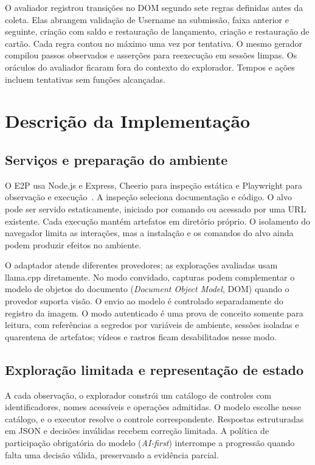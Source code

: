 \documentclass[12pt]{article}
\begin{document}
O avaliador registrou transições no DOM segundo sete regras definidas antes da coleta. Elas abrangem validação de Username na submissão, faixa anterior e seguinte, criação com saldo e restauração de lançamento, criação e restauração de cartão. Cada regra contou no máximo uma vez por tentativa. O mesmo gerador compilou passos observados e asserções para reexecução em sessões limpas. Os oráculos do avaliador ficaram fora do contexto do explorador. Tempos e ações incluem tentativas sem funções alcançadas.

\section{Descrição da Implementação}\label{sec:implementation}
\subsection{Serviços e preparação do ambiente}
O E2P usa Node.js e Express, Cheerio para inspeção estática e Playwright para observação e execução~\cite{microsoft2026playwright}. A inspeção seleciona documentação e código. O alvo pode ser servido estaticamente, iniciado por comando ou acessado por uma URL existente. Cada execução mantém artefatos em diretório próprio. O isolamento do navegador limita as interações, mas a instalação e os comandos do alvo ainda podem produzir efeitos no ambiente.

O adaptador atende diferentes provedores; as explorações avaliadas usam llama.cpp diretamente. No modo convidado, capturas podem complementar o modelo de objetos do documento (\textit{Document Object Model}, DOM) quando o provedor suporta visão. O envio ao modelo é controlado separadamente do registro da imagem. O modo autenticado é uma prova de conceito somente para leitura, com referências a segredos por variáveis de ambiente, sessões isoladas e quarentena de artefatos; vídeos e rastros ficam desabilitados nesse modo.

\subsection{Exploração limitada e representação de estado}
A cada observação, o explorador constrói um catálogo de controles com identificadores, nomes acessíveis e operações admitidas. O modelo escolhe nesse catálogo, e o executor resolve o controle correspondente. Respostas estruturadas em JSON e decisões inválidas recebem correção limitada. A política de participação obrigatória do modelo (\textit{AI-first}) interrompe a progressão quando falta uma decisão válida, preservando a evidência parcial.
\end{document}
